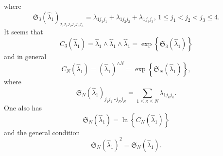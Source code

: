 \documentclass[12pt]{article}
\begin{document}
where 
\begin{equation*}
\mathfrak{S}_{3}\left( \hat{\lambda}_{1}\right)
_{j_{1}j_{1}j_{2}j_{2}j_{3}j_{3}}=\lambda _{1j_{1}j_{1}}+\lambda
_{1j_{2}j_{2}}+\lambda _{1}{}_{j_{3}j_{3}},\,1\leq j_{1}<j_{2}<j_{3}\leq 4. 
\end{equation*}%
It seems that 
\begin{equation*}
C_{3}\left( \hat{\lambda}_{1}\right) =\hat{\lambda}_{1}\wedge \hat{\lambda}%
_{1}\wedge \hat{\lambda}_{1}=\exp \left\{ \mathfrak{S}_{3}\left( \hat{\lambda%
}_{1}\right) \right\} 
\end{equation*}%
and in general 
\begin{equation*}
C_{N}\left( \hat{\lambda}_{1}\right) =\left( \hat{\lambda}_{1}\right)
^{\wedge N}=\exp \left\{ \mathfrak{S}_{N}\left( \hat{\lambda}_{1}\right)
\right\} , 
\end{equation*}%
where 
\begin{equation*}
\mathfrak{S}_{N}\left( \hat{\lambda}_{1}\right) _{j_{1}j_{1}\cdots
j_{N}j_{N}}=\sum_{1\leq \kappa \leq N}\lambda _{1j_{\kappa }j_{\kappa }}. 
\end{equation*}%
One also has%
\begin{equation*}
\mathfrak{S}_{N}\left( \hat{\lambda}_{1}\right) =\ln \left\{ C_{N}\left( 
\hat{\lambda}_{1}\right) \right\} 
\end{equation*}%
and the general condition 
\begin{equation*}
\mathfrak{S}_{N}\left( \hat{\lambda}_{1}\right) ^{2}=\mathfrak{S}_{N}\left( 
\hat{\lambda}_{1}\right) . 
\end{equation*}
\end{document}
